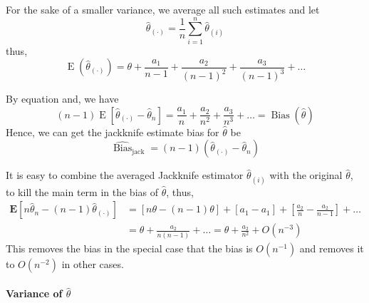 For the sake of a smaller variance, we average all such estimates and let
\begin{equation}
    \hat{\theta}_{(\cdot)}=\frac{1}{n}\sum_{i=1}^{n}\hat{\theta}_{(i)}
\end{equation}
thus,
\begin{equation}
    \operatorname{E}(\hat{\theta}_{(\cdot)})=\theta+\frac{a_{1}}{n-1}+\frac{a_{2}}{\left(n-1\right)^{2}}+\frac{a_{3}}{\left(n-1\right)^{3}}+\ldots
\end{equation}

By equation and, we have
\begin{equation}
    (n-1)\operatorname{E}\left[\hat{\theta}_{(\cdot)}-\hat{\theta}_{n}\right]=\frac{a_{1}}{n}+\frac{a_{2}}{n^{2}}+\frac{a_{3}}{n^{3}}+\ldots=\operatorname{Bias}(\hat{\theta})
\end{equation}
Hence, we can get the jackknife estimate bias for $\hat{\theta}$ be
\begin{equation}
    \widehat{\operatorname{Bias}}_{\text{jack}}=(n-1)\left(\hat{\theta}_{(\cdot)}-\hat{\theta}_{n}\right)
\end{equation}


\begin{remark}
    It is easy to combine the averaged Jackknife estimator $\hat{\theta}_{(i)}$ with the original $\hat{\theta}$, to kill the main term in the bias of $\hat{\theta}$, thus,
    \begin{equation}
        \begin{aligned}
            \mathbf{E}\left[n\hat{\theta}_{n}-(n-1)\hat{\theta}_{(\mathbf{\cdot})}\right] & =\left[n\theta-(n-1)\theta\right]+\left[a_{1}-a_{1}\right]+\left[\frac{a_{2}}{n}-\frac{a_{2}}{n-1}\right]+\ldots \\
                                                                                          & =\theta+\frac{a_{2}}{n(n-1)}+\ldots=\theta+\frac{a_{2}}{n^{2}}+O\left(n^{-3}\right)
        \end{aligned}
    \end{equation}
    This removes the bias in the special case that the bias is $O\left(n^{-1}\right)$ and removes it to $O\left(n^{-2}\right)$ in other cases.
\end{remark}

\paragraph{Variance of $\hat{\theta}$}

